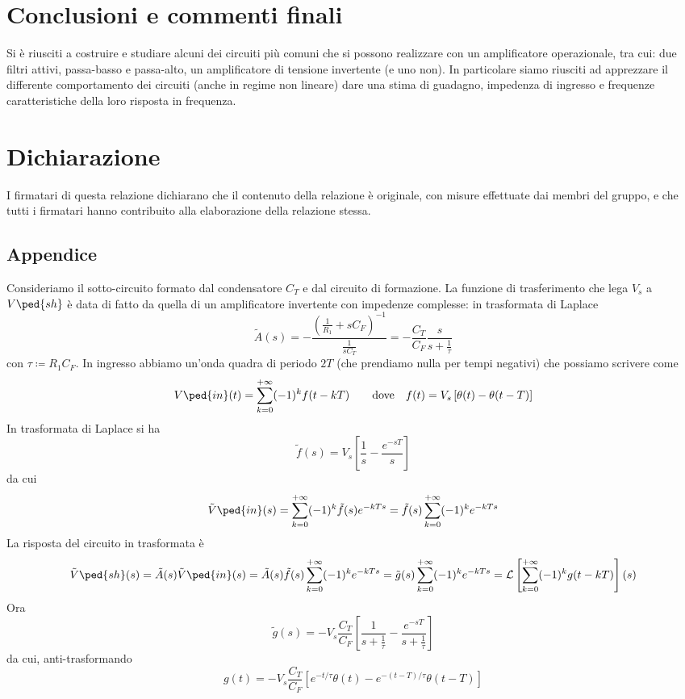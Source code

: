 \documentclass[10pt, a4paper, italian]{article}
\begin{document}
\section*{Conclusioni e commenti finali}
Si è riusciti a costruire e studiare alcuni dei circuiti più comuni che si
possono realizzare con un amplificatore operazionale, tra cui: due filtri
attivi, passa-basso e passa-alto, un amplificatore di tensione invertente
(e uno non).
In particolare siamo riusciti ad apprezzare il differente comportamento dei
circuiti (anche in regime non lineare) dare una stima di guadagno, impedenza di
ingresso e frequenze caratteristiche della loro risposta in frequenza.

\section*{Dichiarazione}
I firmatari di questa relazione dichiarano che il contenuto della relazione \`e
originale, con misure effettuate dai membri del gruppo, e che tutti i firmatari
hanno contribuito alla elaborazione della relazione stessa.


\newpage
\subsection*{Appendice}
Consideriamo il sotto-circuito formato dal condensatore $C_T$ e dal circuito
di formazione. La funzione di trasferimento che lega $V_s$ a $V\ped{sh}$ è
data di fatto da quella di un amplificatore invertente con impedenze
complesse: in trasformata di Laplace
\[
\tilde{A}(s) = - \frac{\left(\frac{1}{R_1} + s 
C_F\right)^{-1}}{\frac{1}{s C_T}} = - \frac{C_T}{C_F} 
\frac{s}{s + \frac{1}{\tau}}
\]
con $ \tau \coloneqq R_1 C_F $. In ingresso abbiamo un'onda quadra di 
periodo $ 2T $ (che prendiamo nulla per tempi negativi) che possiamo scrivere 
come
\[
V\ped{in}(t) = \sum_{k=0}^{+\infty} (-1)^{k}f(t - kT)
\qquad \text{dove} \quad
f(t) = V_s \left[\theta(t) - \theta(t - T)\right]
\]
In trasformata di Laplace si ha
\[
\tilde{f}(s) = V_s\left[\frac{1}{s} - \frac{e^{-sT}}{s}\right]
\]
da cui
\[
\tilde{V}\ped{in}(s) = \sum_{k=0}^{+\infty} (-1)^{k} \tilde{f}(s) e^{-kTs} = 
\tilde{f}(s) \sum_{k=0}^{+\infty} (-1)^{k} e^{-kTs}
\]
La risposta del circuito in trasformata è
\[
  \tilde{V}\ped{sh}(s) = \tilde{A}(s) \tilde{V}\ped{in}(s) =  
\tilde{A}(s)\tilde{f}(s) \sum_{k=0}^{+\infty} (-1)^{k}e^{-kTs} = \tilde{g}(s) 
\sum_{k=0}^{+\infty} (-1)^{k}e^{-kTs} = \mathcal{L}\left[\sum_{k=0}^{+\infty} 
(-1)^{k}g(t - kT)\right](s)
\]
Ora
\[
  \tilde{g}(s) = - V_s \frac{C_T}{C_F} \left[\frac{1}{s + 
\frac{1}{\tau}} - \frac{e^{-sT}}{s + \frac{1}{\tau}}\right]
\]
da cui, anti-trasformando
\[
  g(t) = - V_s \frac{C_T}{C_F} \left[e^{-t/\tau}\theta(t) - 
e^{-(t-T)/\tau} \theta(t - T) \right]
\]
\end{document}
